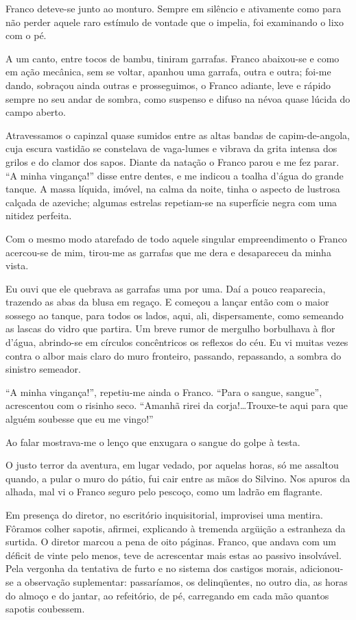 Franco deteve{}-se junto ao
monturo. Sempre em silêncio e ativamente como para não perder aquele
raro estímulo de vontade que o impelia, foi examinando o lixo com o pé.

A um canto, entre tocos de bambu, tiniram garrafas. Franco abaixou{}-se
e como em ação mecânica, sem se voltar, apanhou uma garrafa, outra e
outra; foi{}-me dando, sobraçou ainda outras e prosseguimos, o Franco
adiante, leve e rápido sempre no seu andar de sombra, como suspenso e
difuso na névoa quase lúcida do campo aberto. 

Atravessamos o capinzal
quase sumidos entre as altas bandas de capim{}-de{}-angola, cuja escura
vastidão se constelava de vaga{}-lumes e vibrava da grita intensa dos
grilos e do clamor dos sapos. Diante da natação o Franco parou e me fez
parar. ``A minha vingança!'' disse entre dentes, e me indicou a toalha
d'água do grande tanque. A massa líquida, imóvel, na calma da noite,
tinha o aspecto de lustrosa calçada de azeviche; algumas estrelas
repetiam{}-se na superfície negra com uma nitidez perfeita. 

Com o mesmo
modo atarefado de todo aquele singular empreendimento o Franco
acercou{}-se de mim, tirou{}-me as garrafas que me dera e desapareceu
da minha vista. 

Eu ouvi que ele quebrava as garrafas uma por uma. Daí a
pouco reaparecia, trazendo as abas da blusa em regaço. E começou a
lançar então com o maior sossego ao tanque, para todos os lados, aqui,
ali, dispersamente, como semeando as lascas do vidro que partira. Um
breve rumor de mergulho borbulhava à flor d'água, abrindo{}-se em
círculos concêntricos os reflexos do céu. Eu vi muitas vezes contra o
albor mais claro do muro fronteiro, passando, repassando, a sombra do
sinistro semeador. 

``A minha vingança!'', repetiu{}-me ainda o Franco.
``Para o sangue, sangue'', acrescentou com o risinho seco. ``Amanhã rirei
da corja!\ldots Trouxe{}-te aqui para que alguém soubesse que eu me vingo!'' 

Ao falar mostrava{}-me o lenço que enxugara o sangue do golpe à testa. 

O justo terror da aventura, em lugar vedado, por aquelas horas,
só me assaltou quando, a pular o muro do pátio, fui cair entre as mãos
do Silvino. Nos apuros da alhada, mal vi o Franco seguro pelo pescoço,
como um ladrão em flagrante. 

Em presença do diretor, no escritório
inquisitorial, improvisei uma mentira. Fôramos colher sapotis, afirmei,
explicando à tremenda argüição a estranheza da surtida. O diretor
marcou a pena de oito páginas. Franco, que andava com um déficit de
vinte pelo menos, teve de acrescentar mais estas ao passivo insolvável.
Pela vergonha da tentativa de furto e no sistema dos castigos morais,
adicionou{}-se a observação suplementar: passaríamos, os delinqüentes, no
outro dia, as horas do almoço e do jantar, ao refeitório, de pé, 
carregando em cada mão quantos sapotis coubessem. 

